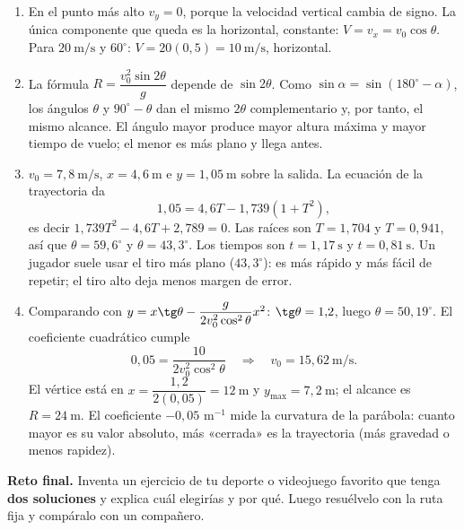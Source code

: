\documentclass[12pt, letterpaper]{article}
\providecommand{\sen}{\sin}
\begin{document}
\begin{enumerate}[leftmargin=*, label=\textbf{\arabic*.}, start=41]
        $y_{\max}=\dfrac{v_0^2\sen^245^\circ}{20}
        =\dfrac{800}{40}=20\ \text{m}$.
  \item En el punto más alto $v_y=0$, porque la velocidad vertical cambia de
        signo. La única componente que queda es la horizontal, constante:
        $V=v_x=v_0\cos\theta$. Para $20\ \text{m/s}$ y $60^\circ$:
        $V=20(0{,}5)=10\ \text{m/s}$, horizontal.
  \item La fórmula $R=\dfrac{v_0^2\sen2\theta}{g}$ depende de $\sen2\theta$.
        Como $\sen\alpha=\sen(180^\circ-\alpha)$, los ángulos $\theta$ y
        $90^\circ-\theta$ dan el mismo $2\theta$ complementario y, por tanto,
        el mismo alcance. El ángulo mayor produce mayor altura máxima y
        mayor tiempo de vuelo; el menor es más plano y llega antes.
  \item $v_0=7{,}8\ \text{m/s}$, $x=4{,}6\ \text{m}$ e $y=1{,}05\ \text{m}$
        sobre la salida. La ecuación de la trayectoria da
        \[
          1{,}05=4{,}6T-1{,}739(1+T^2),
        \]
        es decir $1{,}739T^2-4{,}6T+2{,}789=0$. Las raíces son
        $T=1{,}704$ y $T=0{,}941$, así que
        $\theta=59{,}6^\circ$ y $\theta=43{,}3^\circ$. Los tiempos son
        $t=1{,}17\ \text{s}$ y $t=0{,}81\ \text{s}$. Un jugador suele usar
        el tiro más plano ($43{,}3^\circ$): es más rápido y más fácil de
        repetir; el tiro alto deja menos margen de error.
  \item Comparando con
        $y=x\tg\theta-\dfrac{g}{2v_0^2\cos^2\theta}x^2$:
        $\tg\theta=1{,}2$, luego $\theta=50{,}19^\circ$. El coeficiente
        cuadrático cumple
        \[
          0{,}05=\frac{10}{2v_0^2\cos^2\theta}
          \quad\Rightarrow\quad v_0=15{,}62\ \text{m/s}.
        \]
        El vértice está en $x=\dfrac{1{,}2}{2(0{,}05)}=12\ \text{m}$ y
        $y_{\max}=7{,}2\ \text{m}$; el alcance es $R=24\ \text{m}$. El
        coeficiente $-0{,}05$ m$^{-1}$ mide la curvatura de la parábola:
        cuanto mayor es su valor absoluto, más «cerrada» es la trayectoria
        (más gravedad o menos rapidez).
\end{enumerate}

\begin{cuadroextra}
  \small
  \textbf{Reto final.} Inventa un ejercicio de tu deporte o videojuego
  favorito que tenga \textbf{dos soluciones} y explica cuál elegirías y por
  qué. Luego resuélvelo con la ruta fija y compáralo con un compañero.
\end{cuadroextra}

\fi
\end{document}
